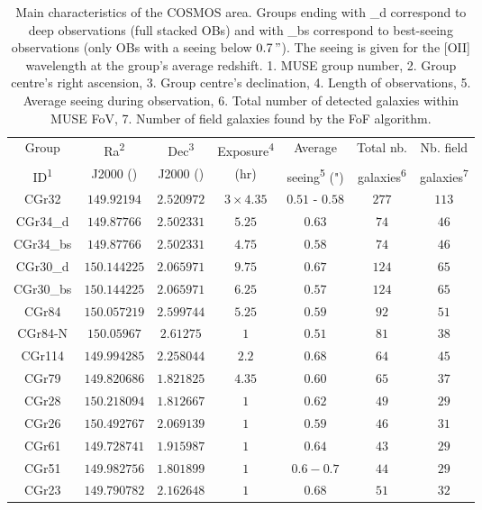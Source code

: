 \begin{table}[htbp]

	\hspace{50pt}

	\begin{tabular}{ccccccc}
	\hline
	Group & Ra\textsuperscript{2} & Dec\textsuperscript{3} & Exposure\textsuperscript{4}  & Average & Total nb. & Nb. field \\
	
	ID\textsuperscript{1} & J2000 (\degree) & J2000 (\degree) & (hr) & seeing\textsuperscript{5} (") & galaxies\textsuperscript{6} & galaxies\textsuperscript{7} \\	
	
	
	\hline
	CGr32 & $149.92194$ & $2.520972$ & $3 \times 4.35$ & $0.51$ - $0.58$ & $277$ & $113$ \\
	\hline
	CGr34\_d & $149.87766$ & $2.502331$ & $5.25$ & $0.63$ & $74$ & $46$ \\
	\hline
	CGr34\_bs & $149.87766$ & $2.502331$ & $4.75$ & $0.58$ & $74$ & $46$ \\
	\hline
	CGr30\_d & $150.144225$ & $2.065971$ & $9.75$ & $0.67$ & $124$ & $65$ \\
	\hline
	CGr30\_bs & $150.144225$ & $2.065971$ & $6.25$ & $0.57$ & $124$ & $65$ \\
	\hline
	CGr84 & $150.057219$ & $2.599744$ & $5.25$ & $0.59$ & $92$ & $51$ \\
	\hline
	CGr84-N & $150.05967$ & $2.61275$ & $1$ & $0.51$ & $81$ & $38$ \\
	\hline
	CGr114 & $149.994285$ & $2.258044$ & $2.2$ & $0.68$ & $64$ & $45$ \\
	\hline
	CGr79 & $149.820686$ & $1.821825$ & $4.35$ & $0.60$ & $65$ & $37$ \\
	\hline
	CGr28 & $150.218094$ & $1.812667$ & $1$ & $0.62$ & $49$ & $29$ \\
	\hline
	CGr26 & $150.492767$ & $2.069139$ & $1$ & $0.59$ & $46$ & $31$ \\
	\hline
	CGr61 & $149.728741$ & $1.915987$ & $1$ & $0.64$ & $43$ & $29$ \\
	\hline
	CGr51 & $149.982756$ & $1.801899$ & $1$ & $0.6-0.7$ & $44$ & $29$ \\
	\hline
	CGr23 & $149.790782$ & $2.162648$ & $1$ & $0.68$ & $51$ & $32$ \\
	\hline
	
	\end{tabular}
	
	\caption[Main characteristics of the COSMOS area.]{\label{table:MUSEfieldsProp}Main characteristics of the COSMOS area. Groups ending with \_d correspond to deep observations (full stacked OBs) and with \_bs correspond to best-seeing observations (only OBs with a seeing below $\SI{0.7}{"}$). The seeing is given for the [OII] wavelength at the group's average redshift. 1. MUSE group number, 2. Group centre's right ascension, 3. Group centre's declination, 4. Length of observations, 5. Average seeing during observation, 6. Total number of detected galaxies within MUSE FoV, 7. Number of field galaxies found by the FoF algorithm.}
\end{table}


